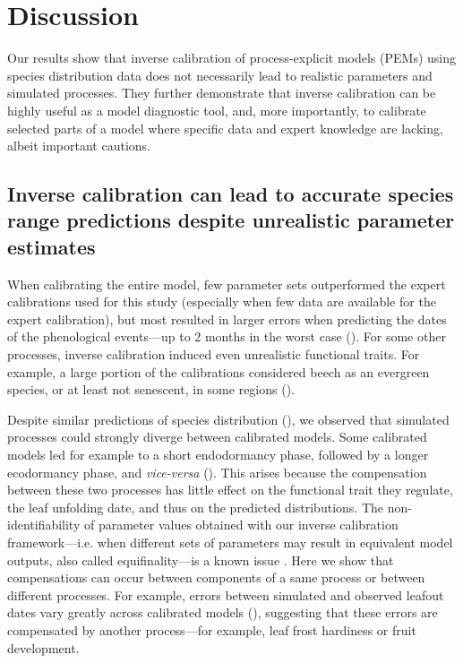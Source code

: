 \documentclass[preprint,12pt,authoryear]{elsarticle}
\begin{document}
{\section{Discussion}

Our results show that inverse calibration of process-explicit models (PEMs) using species distribution data does not necessarily lead to realistic parameters and simulated processes. They further demonstrate that inverse calibration can be highly useful as a model diagnostic tool, and, more importantly, to calibrate selected parts of a model where specific data and expert knowledge are lacking, albeit important cautions.

\subsection{Inverse calibration can lead to accurate species range predictions despite unrealistic parameter estimates}

When calibrating the entire model, few parameter sets outperformed the expert calibrations used for this study (especially when few data are available for the expert calibration), but most resulted in larger errors when predicting the dates of the phenological events---up to 2 months in the worst case ().
For some other processes, inverse calibration induced even unrealistic functional traits. For example, a large portion of the calibrations considered beech as an evergreen species, or at least not senescent, in some regions ().

Despite similar predictions of species distribution (), we observed that simulated processes could strongly diverge between calibrated models. Some calibrated models led for example to a short endodormancy phase, followed by a longer ecodormancy phase, and \textit{vice-versa} (). This arises because the compensation between these two processes has little effect on the functional trait they regulate, the leaf unfolding date, and thus on the predicted distributions. The non-identifiability of parameter values obtained with \textcolor{customred}{our inverse calibration framework}---i.e. when different sets of parameters may result in equivalent model outputs, also called equifinality---is a known issue \citep{He2017, Cameron2022, VanderMeersch2023, Malchow2024}. Here we show that compensations can occur between components of a same process or between different processes. For example, errors between simulated and observed leafout dates vary greatly across calibrated models (), suggesting that these errors are compensated by another process---for example, leaf frost hardiness or fruit development. 

}
\end{document}
